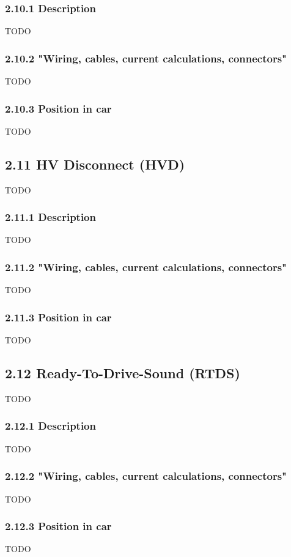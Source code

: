 \documentclass{article}
\begin{document}
\subsubsection*{2.10.1 Description}
TODO

\subsubsection*{2.10.2 "Wiring, cables, current calculations, connectors"}
TODO

\subsubsection*{2.10.3 Position in car}
TODO

\subsection*{2.11 HV Disconnect (HVD)}
TODO

\subsubsection*{2.11.1 Description}
TODO

\subsubsection*{2.11.2 "Wiring, cables, current calculations, connectors"}
TODO

\subsubsection*{2.11.3 Position in car}
TODO

\subsection*{2.12 Ready-To-Drive-Sound (RTDS)}
TODO

\subsubsection*{2.12.1 Description}
TODO

\subsubsection*{2.12.2 "Wiring, cables, current calculations, connectors"}
TODO

\subsubsection*{2.12.3 Position in car}
TODO
\end{document}
